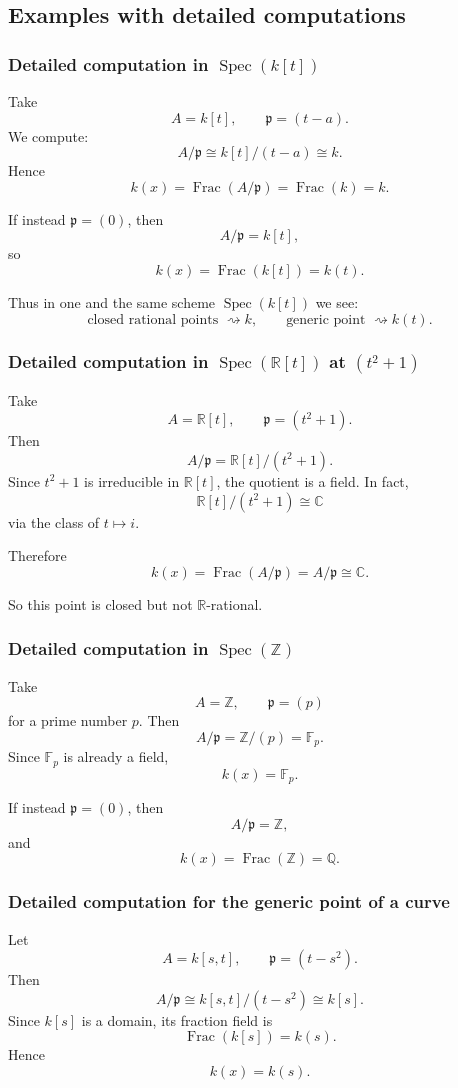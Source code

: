 \documentclass[12pt,a4paper]{article}
\theoremstyle{notespace}
\newcommand{\Spec}{\operatorname{Spec}}
\newcommand{\Frac}{\operatorname{Frac}}
\newcommand{\Z}{\mathbb Z}
\newcommand{\Q}{\mathbb Q}
\newcommand{\R}{\mathbb R}
\newcommand{\C}{\mathbb C}
\newcommand{\F}{\mathbb F}
\newcommand{\p}{\mathfrak p}
\theoremstyle{definition}
\begin{document}
\subsection{Examples with detailed computations}

\subsubsection{Detailed computation in \(\Spec(k[t])\)}

Take
\[
A=k[t],\qquad \p=(t-a).
\]
We compute:
\[
A/\p \cong k[t]/(t-a)\cong k.
\]
Hence
\[
k(x)=\Frac(A/\p)=\Frac(k)=k.
\]

If instead \(\p=(0)\), then
\[
A/\p=k[t],
\]
so
\[
k(x)=\Frac(k[t])=k(t).
\]

Thus in one and the same scheme \(\Spec(k[t])\) we see:
\[
\text{closed rational points } \rightsquigarrow k,\qquad
\text{generic point } \rightsquigarrow k(t).
\]

\subsubsection{Detailed computation in \(\Spec(\R[t])\) at \((t^2+1)\)}

Take
\[
A=\R[t],\qquad \p=(t^2+1).
\]
Then
\[
A/\p = \R[t]/(t^2+1).
\]
Since \(t^2+1\) is irreducible in \(\R[t]\), the quotient is a field.  
In fact,
\[
\R[t]/(t^2+1)\cong \C
\]
via the class of \(t\mapsto i\).

Therefore
\[
k(x)=\Frac(A/\p)=A/\p\cong \C.
\]

So this point is closed but not \(\R\)-rational.

\subsubsection{Detailed computation in \(\Spec(\Z)\)}

Take
\[
A=\Z,\qquad \p=(p)
\]
for a prime number \(p\). Then
\[
A/\p=\Z/(p)=\F_p.
\]
Since \(\F_p\) is already a field,
\[
k(x)=\F_p.
\]

If instead \(\p=(0)\), then
\[
A/\p=\Z,
\]
and
\[
k(x)=\Frac(\Z)=\Q.
\]

\subsubsection{Detailed computation for the generic point of a curve}

Let
\[
A=k[s,t],\qquad \p=(t-s^2).
\]
Then
\[
A/\p \cong k[s,t]/(t-s^2)\cong k[s].
\]
Since \(k[s]\) is a domain, its fraction field is
\[
\Frac(k[s])=k(s).
\]
Hence
\[
k(x)=k(s).
\]
\end{document}
